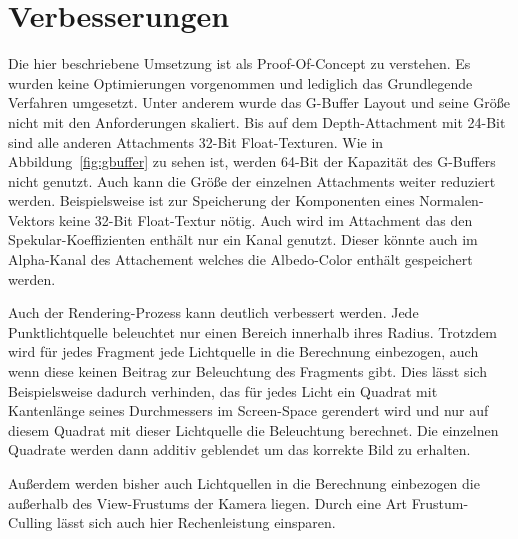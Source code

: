 \chapter{Verbesserungen}
Die hier beschriebene Umsetzung ist als Proof-Of-Concept zu verstehen. Es wurden keine Optimierungen vorgenommen und lediglich das Grundlegende Verfahren umgesetzt. Unter anderem wurde das G-Buffer Layout und seine Größe nicht mit den Anforderungen skaliert. Bis auf dem Depth-Attachment mit 24-Bit sind alle anderen Attachments 32-Bit Float-Texturen. Wie in Abbildung~\ref{fig:gbuffer} zu sehen ist, werden 64-Bit der Kapazität des G-Buffers nicht genutzt. Auch kann die Größe der einzelnen Attachments weiter reduziert werden. Beispielsweise ist zur Speicherung der Komponenten eines Normalen-Vektors keine 32-Bit Float-Textur nötig. Auch wird im Attachment das den Spekular-Koeffizienten enthält nur ein Kanal genutzt. Dieser könnte auch im Alpha-Kanal des Attachement welches die Albedo-Color enthält gespeichert werden.

Auch der Rendering-Prozess kann deutlich verbessert werden. Jede Punktlichtquelle beleuchtet nur einen Bereich innerhalb ihres Radius. Trotzdem wird für jedes Fragment jede Lichtquelle in die Berechnung einbezogen, auch wenn diese keinen Beitrag zur Beleuchtung des Fragments gibt. Dies lässt sich Beispielsweise dadurch verhinden, das für jedes Licht ein Quadrat mit Kantenlänge seines Durchmessers im Screen-Space gerendert wird und nur auf diesem Quadrat mit dieser Lichtquelle die Beleuchtung berechnet. Die einzelnen Quadrate werden dann additiv geblendet um das korrekte Bild zu erhalten.

Außerdem werden bisher auch Lichtquellen in die Berechnung einbezogen die außerhalb des View-Frustums der Kamera liegen. Durch eine Art Frustum-Culling lässt sich auch hier Rechenleistung einsparen.